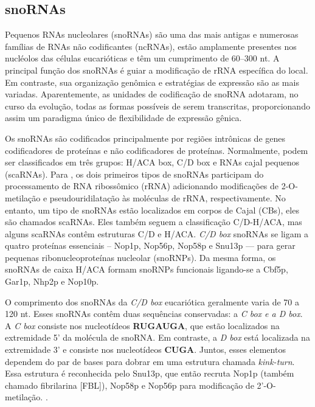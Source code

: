\subsection{snoRNAs}

Pequenos RNAs nucleolares (snoRNAs) são uma das mais antigas e numerosas famílias de RNAs não codificantes (ncRNAs), estão amplamente presentes nos nucléolos das células eucarióticas e têm um cumprimento de 60–300 nt. A principal função dos snoRNAs é guiar a modificação de rRNA específica do local. Em contraste, sua organização genômica e estratégias de expressão são as mais variadas. Aparentemente, as unidades de codificação de snoRNA adotaram, no curso da evolução, todas as formas possíveis de serem transcritas, proporcionando assim um paradigma único de flexibilidade de expressão gênica. \cite{snoRNAs-paradigm}

Os snoRNAs são codificados principalmente por regiões intrônicas de genes codificadores de proteínas e não codificadores de proteínas. Normalmente, podem ser classificados em três grupos: H/ACA box, C/D box e RNAs cajal pequenos (scaRNAs). Para \cite{snoRNAs-content}, os dois primeiros tipos de snoRNAs participam do processamento de RNA ribossômico (rRNA) adicionando modificações de 2-O-metilação e pseudouridilatação às moléculas de rRNA, respectivamente. No entanto, um tipo de snoRNAs estão localizados em corpos de Cajal (CBs), eles são chamados scaRNAs. Eles também seguem a classificação C/D-H/ACA, mas alguns scaRNAs contêm estruturas C/D e H/ACA. \textit{C/D box} snoRNAs se ligam a quatro proteínas essenciais – Nop1p, Nop56p,
Nop58p e Snu13p — para gerar pequenas ribonucleoproteínas nucleolar (snoRNPs). Da mesma forma, os snoRNAs de caixa H/ACA formam snoRNPs funcionais ligando-se a Cbf5p, Gar1p, Nhp2p e Nop10p.

O comprimento dos snoRNAs da \textit{C/D box} eucariótica geralmente varia de 70 a 120 nt. Esses snoRNAs contêm duas sequências conservadas: a \textit{C box e a D box}. A \textit{C box} consiste nos nucleotídeos \textbf{RUGAUGA}, que estão localizados na extremidade 5' da molécula de snoRNA. Em contraste, a \textit{D box} está localizada na extremidade 3' e consiste nos nucleotídeos \textbf{CUGA}. Juntos, esses elementos dependem do par de bases para dobrar em uma estrutura chamada \textit{kink-turn}. Essa estrutura é reconhecida pelo Snu13p, que então recruta Nop1p (também chamado fibrilarina [FBL]), Nop58p e Nop56p para modificação de 2'-O-metilação. \cite{snoRNAs-paradigm}.

